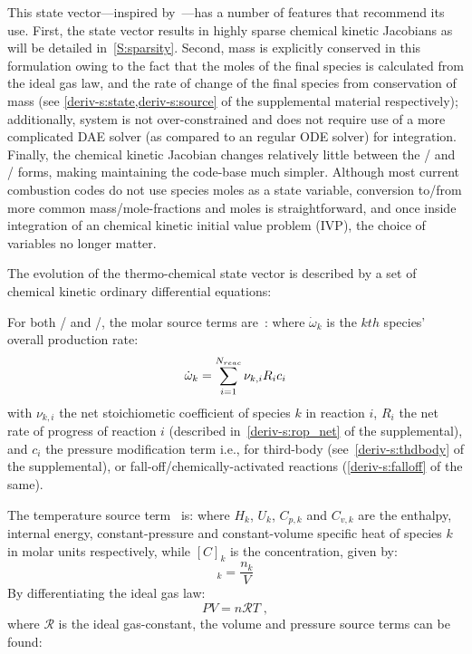 \documentclass[12pt,number,sort&compress,preprint]{elsarticle}
\begin{document}
This state vector---inspired by~\cite{SCHWER2002270}---has a number of features that recommend its use.
First, the state vector results in highly sparse chemical kinetic Jacobians as will be detailed in~\cref{S:sparsity}.
Second, mass is explicitly conserved in this formulation owing to the fact that the moles of the final species is calculated from the ideal gas law, and the rate of change of the final species from conservation of mass (see \cref{deriv-s:state,deriv-s:source} of the supplemental material respectively); additionally, system is not over-constrained and does not require use of a more complicated DAE solver (as compared to an regular ODE solver) for integration.
Finally, the chemical kinetic Jacobian changes relatively little between the \conp/ and \conv/ forms, making maintaining the code-base much simpler.
Although most current combustion codes do not use species moles as a state variable, conversion to\slash from more common mass\slash mole-fractions and moles is straightforward, and once inside integration of an chemical kinetic initial value problem (IVP), the choice of variables no longer matter.

The evolution of the thermo-chemical state vector is described by a set of chemical kinetic ordinary differential equations:

For both \conp/ and \conv/, the molar source terms are~\cite{TurnsStephenR2012Aitc}:
where $\dot{\omega}_k$ is the $kth$ species' overall production rate:
\begin{equation}
 \dot{\omega}_{k} = \sum_{i=1}^{\nr/} \nu_{k, i} R_{i} c_{i}
\end{equation}
with $\nu_{k, i}$ the net stoichiometic coefficient of species $k$ in reaction $i$, $R_{i}$ the net rate of progress of reaction $i$ (described in~\cref{deriv-s:rop_net} of the supplemental), and $c_{i}$ the pressure modification term i.e., for third-body (see~\cref{deriv-s:thdbody} of the supplemental), or fall-off\slash chemically-activated reactions (\cref{deriv-s:falloff} of the same).

The temperature source term~\cite{TurnsStephenR2012Aitc} is:
where $H_k$, $U_k$, $C_{p,k}$ and $C_{v, k}$ are the enthalpy, internal energy, constant-pressure and constant-volume specific heat of species $k$ in molar units respectively, while $[C]_{k}$ is the concentration, given by:
\begin{equation}
 [C]_{k} = \frac{n_{k}}{V}
\end{equation}
By differentiating the ideal gas law:
\begin{equation}
 PV = n\mathcal{R}T \;,
\end{equation}
where $\mathcal{R}$ is the ideal gas-constant, the volume and pressure source terms can be found:
\end{document}
